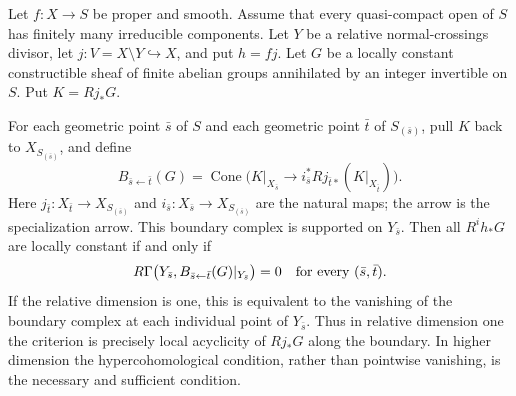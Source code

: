 \begin{proposition}
\label{D:boundary-criterion}
Let $f:X\to S$ be proper and smooth. Assume that every quasi-compact
open of $S$ has finitely many irreducible components. Let $Y$ be a
relative normal-crossings divisor, let $j:V=X\setminus Y
\hookrightarrow X$, and put $h=fj$. Let $G$ be a locally constant
constructible sheaf of finite abelian groups annihilated by an integer
invertible on $S$. Put $K=Rj_*G$.

For each geometric point $\bar s$ of $S$ and each geometric point
$\bar t$ of $S_{(\bar s)}$, pull $K$ back to $X_{S_{(\bar s)}}$,
and define
\[
 B_{\bar s\leftarrow\bar t}(G)=
 \operatorname{Cone}\bigl(K|_{X_{\bar s}}\longrightarrow
       i_{\bar s}^{*}Rj_{\bar t*}(K|_{X_{\bar t}})\bigr).
\]
Here $j_{\bar t}:X_{\bar t}\to X_{S_{(\bar s)}}$ and
$i_{\bar s}:X_{\bar s}\to X_{S_{(\bar s)}}$ are the natural maps;
the arrow is the specialization arrow. This boundary complex is
supported on $Y_{\bar s}$. Then all $R^i h_*G$ are locally constant
if and only if
\begin{equation}\label{D:boundary-condition}
 R\Gamma\bigl(Y_{\bar s}, B_{\bar s\leftarrow\bar t}(G)|_{Y_{\bar s}}\bigr)=0
 \quad\hbox{for every }(\bar s,\bar t).
\end{equation}
If the relative dimension is one, this is equivalent to the vanishing
of the boundary complex at each individual point of $Y_{\bar s}$.
Thus in relative dimension one the criterion is precisely local
acyclicity of $Rj_*G$ along the boundary. In higher dimension the
hypercohomological condition, rather than pointwise vanishing, is the
necessary and sufficient condition.
\end{proposition}
